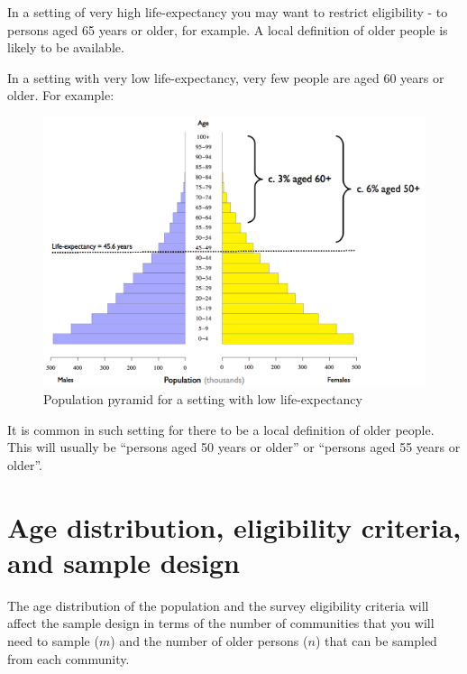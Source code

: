\documentclass[12pt,a4paper]{book}
\theoremstyle{definition}
\theoremstyle{definition}
\theoremstyle{definition}
\theoremstyle{remark}
\begin{document}
In a setting of very high life-expectancy you may want to restrict
eligibility - to persons aged 65 years or older, for example. A local
definition of older people is likely to be available.

In a setting with very low life-expectancy, very few people are aged 60
years or older. For example:

\begin{figure}[H]

{\centering \includegraphics[width=800pt]{figures/popPyramid2} 

}

\caption{Population pyramid for a setting with low life-expectancy}\label{fig:sample3}
\end{figure}

It is common in such setting for there to be a local definition of older
people. This will usually be ``persons aged 50 years or older'' or
``persons aged 55 years or older''.

\hypertarget{age-distribution-eligibility-criteria-and-sample-design}{%
\section{Age distribution, eligibility criteria, and sample
design}\label{age-distribution-eligibility-criteria-and-sample-design}}

The age distribution of the population and the survey eligibility
criteria will affect the sample design in terms of the number of
communities that you will need to sample (\(m\)) and the number of older
persons (\(n\)) that can be sampled from each community.
\end{document}
